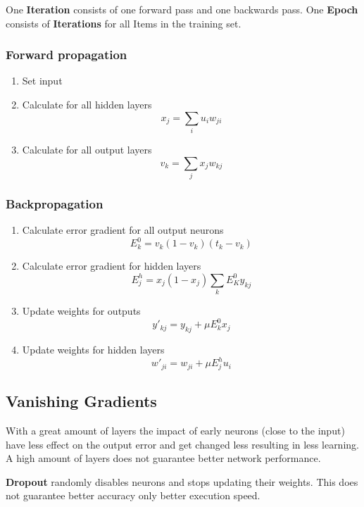 \documentclass[
    fontsize      = 11pt,
    paper         = a4,
    twoside       = false,
    parskip       = half,
    pagesize      = false,
]{scrartcl}
\providecommand{\tightlist}{%
  \setlength{\itemsep}{0pt}\setlength{\parskip}{0pt}}
\begin{document}
One \textbf{Iteration} consists of one forward pass and one backwards
pass. One \textbf{Epoch} consists of \textbf{Iterations} for all Items
in the training set.

\hypertarget{forward-propagation}{%
\subsubsection{Forward propagation}\label{forward-propagation}}

\begin{enumerate}
\def\labelenumi{\arabic{enumi}.}
\tightlist
\item
  Set input
\item
  Calculate for all hidden layers \[x_j = \sum_i u_i w_{ji}\]
\item
  Calculate for all output layers \[v_k = \sum_j x_j w_{kj}\]
\end{enumerate}

\hypertarget{backpropagation}{%
\subsubsection{Backpropagation}\label{backpropagation}}

\begin{enumerate}
\def\labelenumi{\arabic{enumi}.}
\tightlist
\item
  Calculate error gradient for all output neurons
  \[E_k^0 = v_k (1-v_k)(t_k-v_k)\]
\item
  Calculate error gradient for hidden layers
  \[E_j^h = x_j(1-x_j) \sum_k E_K^0 y_{kj}\]
\item
  Update weights for outputs \[y\prime_{kj} = y_{kj} + \mu E_k^0 x_j\]
\item
  Update weights for hidden layers
  \[w\prime_{ji} = w_{ji} + \mu E_j^h u_i\]
\end{enumerate}

\hypertarget{vanishing-gradients}{%
\subsection{Vanishing Gradients}\label{vanishing-gradients}}

With a great amount of layers the impact of early neurons (close to the
input) have less effect on the output error and get changed less
resulting in less learning. A high amount of layers does not guarantee
better network performance.

\textbf{Dropout} randomly disables neurons and stops updating their
weights. This does not guarantee better accuracy only better execution
speed.
\end{document}
